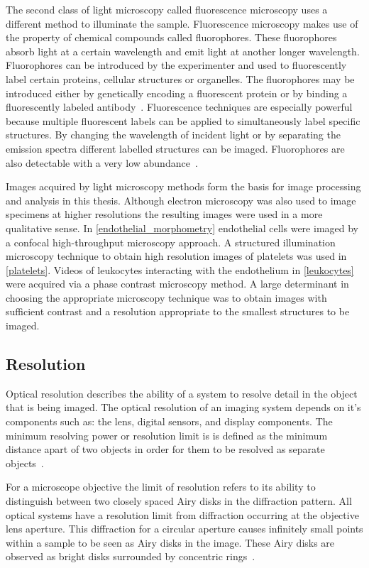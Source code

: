 The second class of light microscopy called fluorescence microscopy uses a different method to illuminate the sample. Fluorescence microscopy makes use of the property of chemical compounds called fluorophores. These fluorophores absorb light at a certain wavelength and emit light at another longer wavelength. Fluorophores can be introduced by the experimenter and used to fluorescently label certain proteins, cellular structures or organelles. The fluorophores may be introduced either by genetically encoding a fluorescent protein or by binding a fluorescently labeled antibody~\cite{Thorn2016}. Fluorescence techniques are especially powerful because multiple fluorescent labels can be applied to simultaneously label specific structures. By changing the wavelength of incident light or by separating the emission spectra different labelled structures can be imaged. Fluorophores are also detectable with a very low abundance~\cite{Ljosa2009}.

Images acquired by light microscopy methods form the basis for image processing and analysis in this thesis. Although electron microscopy was also used to image specimens at higher resolutions the resulting images were used in a more qualitative sense. In \autoref{endothelial_morphometry} endothelial cells were imaged by a confocal high-throughput microscopy approach. A structured illumination microscopy technique to obtain high resolution images of platelets was used in \autoref{platelets}. Videos of leukocytes interacting with the endothelium in \autoref{leukocytes} were acquired via a phase contrast microscopy method. A large determinant in choosing the appropriate microscopy technique was to obtain images with sufficient contrast and a resolution appropriate to the smallest structures to be imaged.

\subsection{Resolution}
\label{introduction:microscopy:resolution}
Optical resolution describes the ability of a system to resolve detail in the object that is being imaged. The optical resolution of an imaging system depends on it's components such as: the lens, digital sensors, and display components. The minimum resolving power or resolution limit is is defined as the minimum distance apart of two objects in order for them to be resolved as separate objects~\cite{Abbe1873}. 

For a microscope objective the limit of resolution refers to its ability to distinguish between two closely spaced Airy disks in the diffraction pattern. All optical systems have a resolution limit from diffraction occurring at the objective lens aperture. This diffraction for a circular aperture causes infinitely small points within a sample to be seen as Airy disks in the image. These Airy disks are observed as bright disks surrounded by concentric rings~\cite{Spector2006}.


